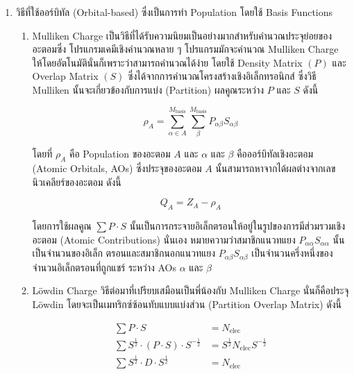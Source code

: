 \begin{enumerate}
    \item วิธีที่ใช้ออร์บิทัล (Orbital-based) ซึ่งเป็นการทำ Population โดยใช้ Basis Functions
        \begin{enumerate}
            \item Mulliken Charge\autocite{szabo1996} เป็นวิธีที่ได้รับความนิยมเป็นอย่างมากสำหรับคำนวณประจุย่อยของอะตอมซึ่ง%
            โปรแกรมเคมีเชิงคำนวณหลาย ๆ โปรแกรมมักจะคำนวณ Mulliken Charge ให้โดยอัตโนมัตินั่นก็เพราะว่าสามารถคำนวณได้ง่าย%
            โดยใช้ Density Matrix $(P)$ และ Overlap Matrix $(S)$ ซึ่งได้จากการคำนวณโครงสร้างเชิงอิเล็กทรอนิกส์ ซึ่งวิธี 
            Mulliken นั้นจะเกี่ยวข้องกับการแบ่ง (Partition) ผลคูณระหว่าง $P$ และ $S$ ดังนี้

            \begin{equation}\label{eq:mulliken_pop}
                \rho_{A} = \sum^{M_{\text{basis}}}_{\alpha \in A} \sum^{M_{\text{basis}}}_{\beta}
                P_{\alpha\beta} S_{\alpha\beta}
            \end{equation}

            \noindent โดยที่ $\rho_{A}$ คือ Population ของอะตอม $A$ และ $\alpha$ และ $\beta$ คือออร์บิทัลเชิงอะตอม 
            (Atomic Orbitals, AOs) ซึ่งประจุของอะตอม $A$ นั้นสามารถหาจากได้ผลต่างจากเลขนิวเคลียร์ของอะตอม ดังนี้

            \begin{equation}\label{eq:mulliken_charge}
                Q_{A} = Z_{A} - \rho_{A}
            \end{equation}

            \noindent โดยการใช้ผลคูณ $\sum P \cdot S$ นั้นเป็นการกระจายอิเล็กตรอนให้อยู่ในรูปของการมีส่วมรวมเชิงอะตอม (Atomic 
            Contributions) นั่นเอง หมายความว่าสมาชิกแนวทแยง $P_{\alpha\alpha} S_{\alpha\alpha}$ นั้นเป็นจำนวนของอิเล็ก%
            ตรอนและสมาชิกนอกแนวทแยง $P_{\alpha\beta} S_{\alpha\beta}$ เป็นจำนวนครึ่งหนึ่งของจำนวนอิเล็กตรอนที่ถูกแชร์%
            ระหว่าง AOs $\alpha$ และ $\beta$
            
            \item L\"{o}wdin Charge\autocite{lowdin1950} วิธีต่อมาที่เปรียบเสมือนเป็นพี่น้องกับ Mulliken Charge นั่นก็คือประจุ
            L\"{o}wdin โดยจะเป็นเมทริกซ์ซ้อนทับแบบแบ่งส่วน (Partition Overlap Matrix) ดังนี้

            \begin{align}
                \sum P \cdot S &= N_{\text{elec}} \\
                \sum S^{\frac{1}{2}} \cdot (P \cdot S) \cdot S^{-\frac{1}{2}} &= 
                S^{\frac{1}{2}} N_{\text{elec}} S^{-\frac{1}{2}}\\
                \sum S^{\frac{1}{2}} \cdot D \cdot S^{\frac{1}{2}} &= N_{\text{elec}} \label{eq:lowdin_charge}
            \end{align}
        \end{enumerate}


\end{enumerate}
